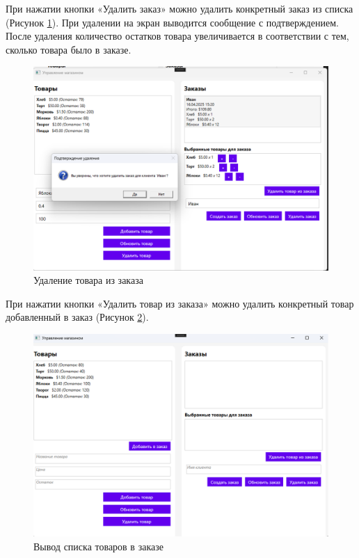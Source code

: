 \documentclass[12pt]{article}
\begin{document}
\pagebreak

При нажатии кнопки «Удалить заказ» можно удалить конкретный заказ из списка (Рисунок \ref{fig:demo9}). При удалении на экран выводится сообщение с подтверждением. После удаления количество остатков товара увеличивается в соответствии с тем, сколько товара было в заказе.

\begin{figure}[ht]
	\centering
	\includegraphics[width=1.0\textwidth]{fig/image 66.png}
	\caption{Удаление товара из заказа}
	\label{fig:demo9}
\end{figure}

\pagebreak


При нажатии кнопки «Удалить товар из заказа» можно удалить конкретный товар добавленный в заказ (Рисунок \ref{fig:demo10}).


\begin{figure}[ht]
	\centering
	\includegraphics[width=1.0\textwidth]{fig/image 67.png}
	\caption{Вывод списка товаров в заказе}
	\label{fig:demo10}
\end{figure}
\end{document}
